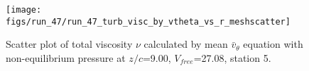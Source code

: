 \begin{figure}[H]
\centering
\texttt{[image: figs/run\_47/run\_47\_turb\_visc\_by\_vtheta\_vs\_r\_meshscatter]}
\caption{Scatter plot of total viscosity $\nu$ calculated by mean $\bar{v}_{\theta}$ equation with non-equilibrium pressure at $z/c$=9.00, $V_{free}$=27.08, station 5.}
\label{fig:run_47_turb_visc_by_vtheta_vs_r_meshscatter}
\end{figure}


